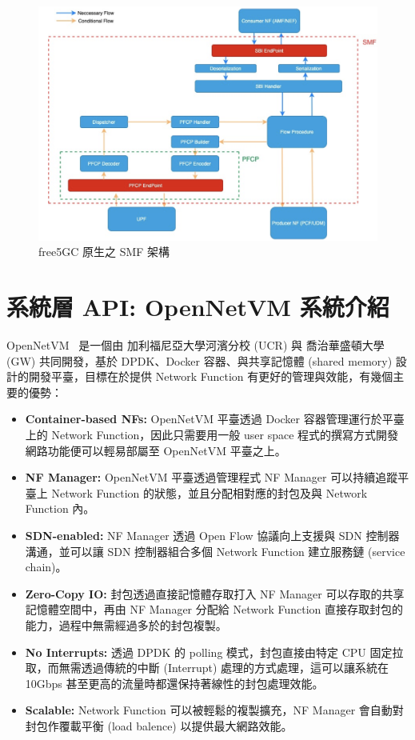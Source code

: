 \begin{figure}[htbp]
    \centering
    \includegraphics[height=!,width=1\linewidth,keepaspectratio=true]{figures/free5gc_smf_arch}
    \caption[free5GC 原生之 SMF 架構]{{\footnotesize free5GC 原生之 SMF 架構}}
    \label{fig:free5gc_smf_arch}
\end{figure}

\section{系統層 API: OpenNetVM 系統介紹}
\label{sec:opennetvm_intro}

OpenNetVM~\cite{onvm} 是一個由 加利福尼亞大學河濱分校 (UCR) 與 喬治華盛頓大學 (GW) 共同開發，基於 DPDK、Docker 容器、與共享記憶體 (shared memory) 設計的開發平臺，目標在於提供 Network Function 有更好的管理與效能，有幾個主要的優勢：

\begin{itemize}
\item \textbf{Container-based NFs:} OpenNetVM 平臺透過 Docker 容器管理運行於平臺上的 Network Function，因此只需要用一般 user space 程式的撰寫方式開發網路功能便可以輕易部屬至 OpenNetVM 平臺之上。
\item \textbf{NF Manager:} OpenNetVM 平臺透過管理程式 NF Manager 可以持續追蹤平臺上 Network Function 的狀態，並且分配相對應的封包及與 Network Function 內。
\item \textbf{SDN-enabled:} NF Manager 透過 Open Flow 協議向上支援與 SDN 控制器溝通，並可以讓 SDN 控制器組合多個 Network Function 建立服務鏈 (service chain)。
\item \textbf{Zero-Copy IO:} 封包透過直接記憶體存取打入 NF Manager 可以存取的共享記憶體空間中，再由 NF Manager 分配給 Network Function 直接存取封包的能力，過程中無需經過多於的封包複製。
\item \textbf{No Interrupts:} 透過 DPDK 的 polling 模式，封包直接由特定 CPU 固定拉取，而無需透過傳統的中斷 (Interrupt) 處理的方式處理，這可以讓系統在 10Gbps 甚至更高的流量時都還保持著線性的封包處理效能。
\item \textbf{Scalable:} Network Function 可以被輕鬆的複製擴充，NF Manager 會自動對封包作覆載平衡 (load balence) 以提供最大網路效能。
\end{itemize}

